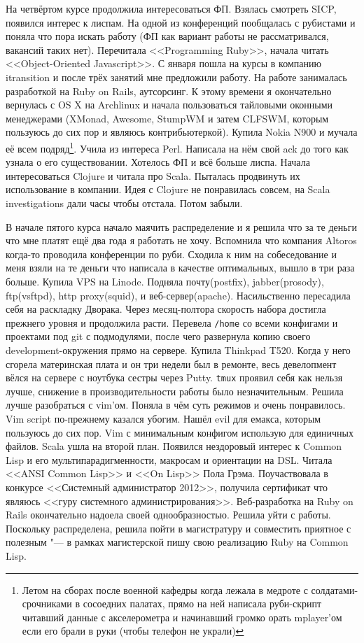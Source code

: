 \documentclass[14pt,a4paper]{extarticle}
\begin{document}
На четвёртом курсе продолжила интересоваться ФП. Взялась смотреть
SICP, появился интерес к лиспам. На одной из конференций
пообщалась с рубистами и поняла что пора искать работу (ФП как вариант
работы не рассматривался, вакансий таких нет). Перечитала <<Programming
Ruby>>, начала читать <<Object-Oriented Javascript>>. С января пошла на курсы
в компанию itransition и после трёх занятий мне предложили работу.
На работе занималась разработкой на Ruby on Rails, аутсорсинг. К
этому времени я окончательно вернулась с OS X на Archlinux и начала
пользоваться тайловыми оконными менеджерами (XMonad, Awesome,
StumpWM и затем CLFSWM, которым пользуюсь до сих пор и являюсь
контрибьютеркой). Купила Nokia N900 и мучала её всем подряд\footnote{
Летом на сборах после военной кафедры когда лежала в медроте с
солдатами-срочниками в сосоедних палатах, прямо на ней написала руби-скрипт читавший данные
с акселерометра и начинавший громко орать mplayer'ом если его брали в
руки (чтобы телефон не украли)}. Учила из
интереса Perl. Написала на нём свой ack до того как узнала о его
существовании. Хотелось ФП и всё больше лиспа. Начала интересоваться
Clojure и читала про Scala. Пыталась продвинуть их использование в
компании. Идея с Clojure не понравилась совсем, на Scala
investigations дали часы чтобы отстала. Потом забыли.

В начале пятого курса начало маячить распределение и я решила что за те
деньги что мне платят ещё два года я работать не
хочу. Вспомнила что компания Altoros когда-то проводила конференции по
руби. Сходила к ним на собеседование и меня взяли на те деньги что
написала в качестве оптимальных, вышло в три раза больше. Купила VPS на
Linode. Подняла почту(postfix), jabber(prosody), ftp(vsftpd), http
proxy(squid), и веб-сервер(apache). Насильственно пересадила себя на
раскладку Дворака. Через месяц-полтора скорость набора достигла
прежнего уровня и продолжила расти. Перевела {\tt /home} со всеми
конфигами и проектами под git с подмодулями, после чего развернула копию своего
development-окружения прямо на сервере. Купила Thinkpad T520. Когда у
него сгорела материнская плата и он три недели был в ремонте,
весь девелопмент вёлся на сервере с ноутбука сестры через Putty. {\tt tmux}
проявил себя как нельзя лучше, снижение в производительности работы
было незначительным. Решила лучше разобраться с vim'ом. Поняла в чём
суть режимов и очень понравилось. Vim script по-прежнему казался
убогим. Нашёл evil для емакса, которым пользуюсь до сих пор. Vim с
минимальным конфигом использую для единичных файлов. Scala ушла на
второй план. Появился нездоровый интерес к Common Lisp и его
мультипарадигменности, макросам и ориентации на DSL. Читала <<ANSI Common
Lisp>> и <<On Lisp>> Пола Грэма. Поучаствовала в конкурсе <<Системный
администратор 2012>>, получила сертификат что являюсь <<гуру системного
администрирования>>. Веб-разработка на Ruby on Rails окончательно надоела своей
однообразностью. Решила уйти с работы. Поскольку распределена, решила
пойти в магистратуру и совместить приятное с полезным "--- в рамках
магистерской пишу свою реализацию Ruby на Common Lisp.
\end{document}
